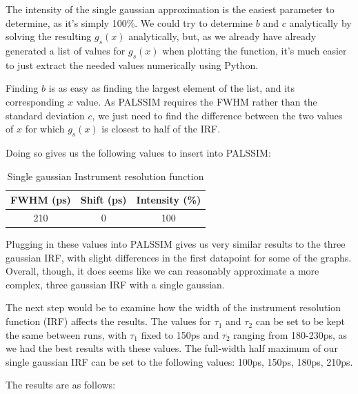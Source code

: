 The intensity of the single gaussian approximation is the easiest parameter to determine, as it's simply 100\%. We could try to determine $b$ and $c$ analytically by solving the resulting $g_s(x)$ analytically, but, as we already have already generated a list of values for $g_s(x)$ when plotting the function, it's much easier to just extract the needed values numerically using Python.

Finding $b$ is as easy as finding the largest element of the list, and its corresponding $x$ value. As PALSSIM requires the FWHM rather than the standard deviation $c$, we just need to find the difference between the two values of $x$ for which $g_s(x)$ is closest to half of the IRF.

Doing so gives us the following values to insert into PALSSIM:

\begin{table}[h]
    \centering
    \begin{tabular}{|c|c|c|}
        \hline
        FWHM (ps) &  Shift (ps) & Intensity (\%) \\
        \hline
        210 & 0 & 100\\ 
        \hline
    \end{tabular}
    \caption{Single gaussian Instrument resolution function}
    \label{tab:irf-single}
\end{table}

Plugging in these values into PALSSIM gives us very similar results to the three gaussian IRF, with slight differences in the first datapoint for some of the graphs. Overall, though, it does seems like we can reasonably approximate a more complex, three gaussian IRF with a single gaussian.

The next step would be to examine how the width of the instrument resolution function (IRF) affects the results. The values for $\tau_1$ and $\tau_2$ can be set to be kept the same between runs, with $\tau_1$ fixed to 150ps and $\tau_2$ ranging from 180-230ps, as we had the best results with these values. The full-width half maximum of our single gaussian IRF can be set to the following values: 100ps, 150ps, 180ps, 210ps.

The results are as follows:


